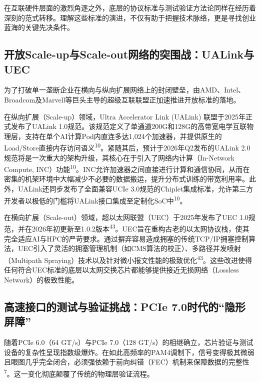 在互联硬件层面的激烈角逐之外，底层的协议标准与测试验证方法论同样在经历着深刻的范式转移。理解这些标准的演进，不仅有助于把握技术脉络，更是寻找创业蓝海的关键先决条件。

\subsection{开放Scale-up与Scale-out网络的突围战：UALink与UEC}

为了打破单一垄断企业在横向与纵向扩展网络上的封闭壁垒，由AMD、Intel、Broadcom及Marvell等巨头主导的超级互联联盟正加速推进开放标准的落地。

在纵向扩展（Scale-up）领域，Ultra Accelerator Link (UALink) 联盟于2025年正式发布了UALink 1.0规范。该规范定义了单通道200G和128G的高带宽电学互联物理层，支持在单个AI计算Pod内直连多达1,024个加速器，并提供原生的Load/Store直接内存访问语义\textsuperscript{10}。紧随其后，预计于2026年Q2发布的UALink 2.0规范将是一次重大的架构升级，其核心在于引入了网络内计算（In-Network Compute, INC）功能\textsuperscript{10}。INC允许加速器之间直接进行计算和通信协同，从而在密集的机架环境中大幅减少不必要的数据搬运，提升分布式训练的带宽利用率。此外，UALink还同步发布了全面兼容UCIe 3.0规范的Chiplet集成标准，允许第三方开发者以极低的门槛将UALink接口集成至定制化SoC中\textsuperscript{10}。

在横向扩展（Scale-out）领域，超以太网联盟（UEC）于2025年发布了UEC 1.0规范，并在2026年初更新至1.0.2版本\textsuperscript{43}。UEC旨在重构古老的以太网协议栈，使其完全适应AI与HPC的严苛要求。通过摒弃容易造成拥塞的传统TCP/IP拥塞控制算法，UEC引入了灵活的拥塞管理机制（如CMS算法的校正）、多路径并发喷射（Multipath Spraying）技术以及针对微小报文性能的极致优化\textsuperscript{43}。这些改进使得任何符合UEC标准的底层以太网交换芯片都能够提供接近无损网络（Lossless Network）的极致性能。

\subsection{高速接口的测试与验证挑战：PCIe 7.0时代的``隐形屏障''}

随着PCIe 6.0（64 GT/s）与PCIe 7.0（128 GT/s）的相继确立，芯片验证与测试设备的复杂性呈现指数级爆炸。在如此高频率的PAM4调制下，信号变得极其微弱且眼图几乎完全闭合，必须强依赖于前向纠错（FEC）机制来保障数据的完整性\textsuperscript{7}。这一变化彻底颠覆了传统的物理层验证流程。

